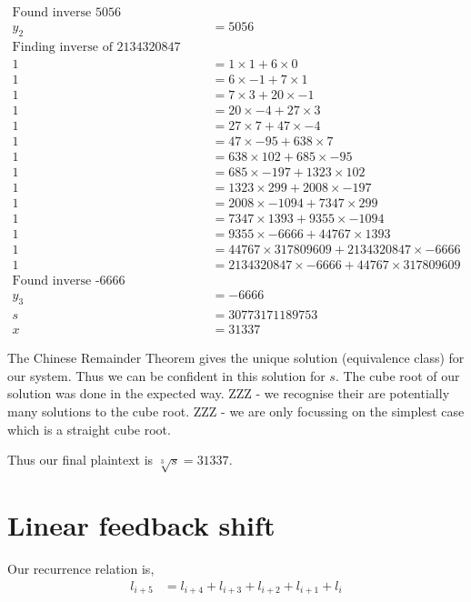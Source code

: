 \documentclass{article}
\begin{document}
\begin{align*}
    \text{Found inverse 5056} \\
    y_2 &= 5056 \\
    \text{Finding inverse of 2134320847 mod 44767} \\
    1 &= 1 \times 1 + 6 \times 0 \\
    1 &= 6 \times -1 + 7 \times 1 \\
    1 &= 7 \times 3 + 20 \times -1 \\
    1 &= 20 \times -4 + 27 \times 3 \\
    1 &= 27 \times 7 + 47 \times -4 \\
    1 &= 47 \times -95 + 638 \times 7 \\
    1 &= 638 \times 102 + 685 \times -95 \\
    1 &= 685 \times -197 + 1323 \times 102 \\
    1 &= 1323 \times 299 + 2008 \times -197 \\
    1 &= 2008 \times -1094 + 7347 \times 299 \\
    1 &= 7347 \times 1393 + 9355 \times -1094 \\
    1 &= 9355 \times -6666 + 44767 \times 1393 \\
    1 &= 44767 \times 317809609 + 2134320847 \times -6666 \\
    1 &= 2134320847 \times -6666 + 44767 \times 317809609 \\
    \text{Found inverse -6666} \\
    y_3 &= -6666 \\
    s &= 30773171189753 \\
    x &= 31337
\end{align*}

The Chinese Remainder Theorem gives the unique solution (equivalence class)
for our system. Thus we can be confident in this solution for $s$.
The cube root of our solution was done in the expected way.
ZZZ - we recognise their are potentially many solutions to the cube root.
ZZZ - we are only focussing on the simplest case which is a straight cube root.

Thus our final plaintext is $\sqrt[3]{s} = 31337$.

\section{Linear feedback shift}
Our recurrence relation is,
\begin{align*}
    l_{i+5} &= l_{i+4} + l_{i+3} + l_{i+2} + l_{i+1} + l_{i}
\end{align*}
\end{document}

